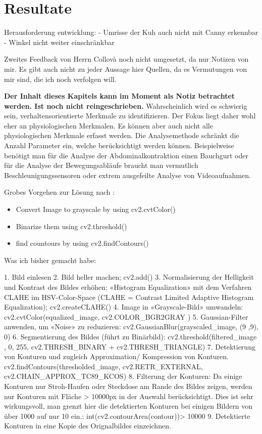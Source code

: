 

\chapter{Resultate}

Herausforderung entwicklung:
- Umrisse der Kuh auch nicht mit Canny erkennbar
- Winkel nicht weiter einschränkbar

Zweites Feedback von Herrn Collovà noch nicht umgesetzt, da nur Notizen von mir. Es gibt auch nicht zu jeder Aussage hier Quellen, da es Vermutungen von mir sind, die ich noch verfolgen will. 

\textbf{Der Inhalt dieses Kapitels kann im Moment als Notiz betrachtet werden. Ist noch nicht reingeschrieben.} \newline
Wahrscheinlich wird es schwierig sein, verhaltensorientierte Merkmale zu identifizieren. Der Fokus liegt daher wohl eher an physiologischen Merkmalen. 
Es können aber auch nicht alle physiologischen Merkmale erfasst werden. Die Analysemethode schränkt die Anzahl Parameter ein, welche berücksichtigt werden können. Beispielweise benötigt man für die Analyse der Abdominalkontraktion einen Bauchgurt oder für die Analyse der Bewegungsabläufe braucht man vermutlich Beschleunigungssensoren oder extrem ausgefeilte Analyse von Videoaufnahmen.

Grobes Vorgehen zur Lösung nach \citep[S. 256]{FernandezVillan2019}: 

\begin{itemize}
	\item Convert Image to grayscale by using cv2.cvtColor()
	\item Binarize them using cv2.threshold()
	\item find countours by using cv2.findContours()
\end{itemize}

Was ich bisher gemacht habe: 

1.	Bild einlesen
2.	Bild heller machen; cv2.add()
3.	Normalisierung der Helligkeit und Kontrast des Bildes erhöhen: «Histogram Equalization» mit dem Verfahren CLAHE im HSV-Color-Space (CLAHE = Contrast Limited Adaptive Histogram Equalization); cv2.createCLAHE()
4.	Image in «Grayscale-Bild» umwandeln: cv2.cvtColor(equalized\_image, cv2.COLOR\_BGR2GRAY )
5.	Gaussian-Filter anwenden, um «Noise» zu reduzieren: cv2.GaussianBlur(grayscaled\_image, (9  ,9), 0)
6.	Segmentierung des Bildes  (führt zu Binärbild): cv2.threshold(filtered\_image , 0, 255, cv2.THRESH\_BINARY + cv2.THRESH\_TRIANGLE)
7.	Detektierung von Konturen und zugleich Approximation/ Kompression von Konturen. cv2.findContours(thresholded\_image, cv2.RETR\_EXTERNAL, cv2.CHAIN\_APPROX\_TC89\_KCOS)
8.	Filterung der Konturen: Da einige Konturen nur Stroh-Haufen oder Steckdose am Rande des Bildes zeigen, werden nur Konturen mit Fläche > 10000px in der Auswahl berücksichtigt. Dies ist sehr wirkungsvoll, man grenzt hier die detektierten Konturen bei einigen Bildern von über 1000 auf nur 10 ein.: int(cv2.contourArea(contour))> 10000
9.	Detektierte Konturen in eine Kopie des Orignalbildes einzeichnen.

